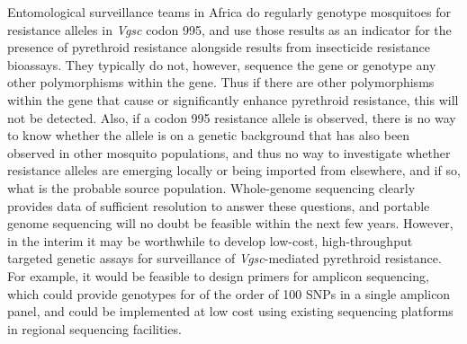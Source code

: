 \documentclass[a4paper,11pt,abstracton,hidelinks]{scrartcl}
\begin{document}
%
Entomological surveillance teams in Africa do regularly genotype mosquitoes for resistance alleles in \textit{Vgsc} codon 995, and use those results as an indicator for the presence of pyrethroid resistance alongside results from insecticide resistance bioassays.
%
They typically do not, however, sequence the gene or genotype any other polymorphisms within the gene.
%
Thus if there are other polymorphisms within the gene that cause or significantly enhance pyrethroid resistance, this will not be detected.
%
Also, if a codon 995 resistance allele is observed, there is no way to know whether the allele is on a genetic background that has also been observed in other mosquito populations, and thus no way to investigate whether resistance alleles are emerging locally or being imported from elsewhere, and if so, what is the probable source population.
%
Whole-genome sequencing clearly provides data of sufficient resolution to answer these questions, and portable genome sequencing will no doubt be feasible within the next few years.
%
However, in the interim it may be worthwhile to develop low-cost, high-throughput targeted genetic assays for surveillance of \textit{Vgsc}-mediated pyrethroid resistance.
%
For example, it would be feasible to design primers for amplicon sequencing, which could provide genotypes for of the order of 100 SNPs in a single amplicon panel, and could be implemented at low cost using existing sequencing platforms in regional sequencing facilities.
\end{document}
